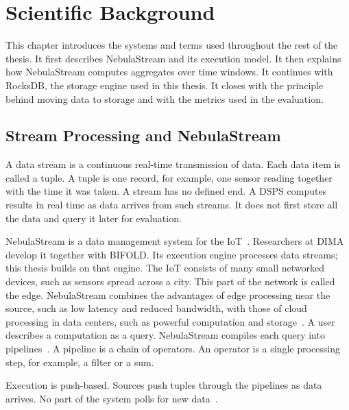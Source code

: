 \chapter{Scientific Background\label{cha:background}}

This chapter introduces the systems and terms used throughout the rest of the thesis.
It first describes NebulaStream and its execution model.
It then explains how NebulaStream computes aggregates over time windows.
It continues with RocksDB, the storage engine used in this thesis.
It closes with the principle behind moving data to storage and with the metrics used in the evaluation.

\section{Stream Processing and NebulaStream\label{sec:bg-nes}}

A data stream is a continuous real-time transmission of data.
Each data item is called a tuple.
A tuple is one record, for example, one sensor reading together with the time it was taken.
A stream has no defined end.
A \ac{DSPS} computes results in real time as data arrives from such streams.
It does not first store all the data and query it later for evaluation.

NebulaStream is a data management system for the \ac{IoT}~\cite{zeuch2020,zeuch2022}.
Researchers at \ac{DIMA} develop it together with \ac{BIFOLD}.
Its execution engine processes data streams; this thesis builds on that engine.
The \ac{IoT} consists of many small networked devices, such as sensors spread across a city. 
This part of the network is called the edge.
NebulaStream combines the advantages of edge processing near the source, such as low latency and reduced bandwidth, with those of cloud processing in data centers, such as powerful computation and storage~\cite{zeuch2020,zeuch2022}.
A user describes a computation as a query.
NebulaStream compiles each query into pipelines~\cite{zeuch2020,zeuch2022}.
A pipeline is a chain of operators.
An operator is a single processing step, for example, a filter or a sum.

Execution is push-based.
Sources push tuples through the pipelines as data arrives.
No part of the system polls for new data~\cite{zeuch2020,zeuch2022}.

